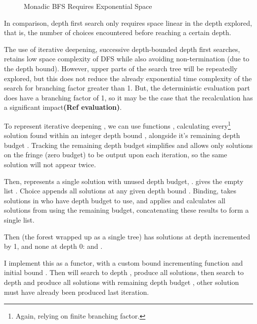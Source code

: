 \begin{figure}

\caption{Monadic BFS Requires Exponential Space}
\end{figure}

In comparison, depth first search only requires space linear in the depth explored, that is, the number of choices encountered before reaching a certain depth.

The use of iterative deepening, successive depth-bounded depth first searches, retains low space complexity of DFS while also avoiding non-termination (due to the depth bound). However, upper parts of the search tree will be repeatedly explored, but this does not reduce the already exponential time complexity of the search for branching factor greater than 1. But, the deterministic evaluation part does have a branching factor of 1, so it may be the case that the recalculation has a significant impact\textbf{(Ref evaluation)}. 

To represent iterative deepening \cite{SearchAlgebra}, we can use functions , calculating every\footnote{Again, relying on finite branching factor.} solution found within an integer depth bound , alongside it's remaining depth budget . Tracking the remaining depth budget simplifies  and allows only solutions on the fringe (zero budget) to be output upon each iteration, so the same solution will not appear twice.

Then,  represents a single solution with unused depth budget, .  gives the empty list . Choice appends all solutions at any given depth bound . Binding,  takes solutions in  who have depth budget to use, and applies  and calculates all solutions from  using the remaining budget, concatenating these results to form a single list.

Then  (the forest  wrapped up as a single tree) has solutions at depth incremented by 1, and none at depth 0:  and .

I implement this as a functor, with a custom bound incrementing function  and initial bound . Then  will   search to depth , produce all solutions, then search to depth  and produce all solutions with remaining depth budget , other solution must have already been produced last iteration.

